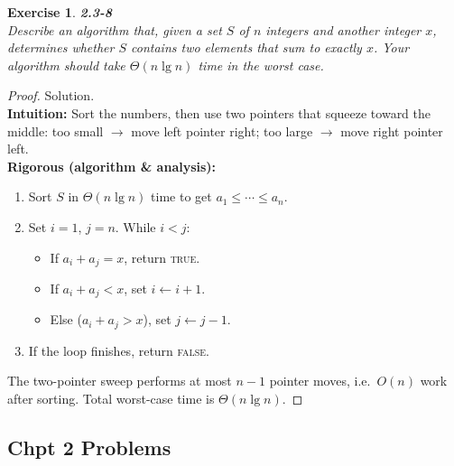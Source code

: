 \documentclass[12pt]{article}
\newtheorem{exercise}[theorem]{Exercise}
\theoremstyle{definition}
\begin{document}
\newpage

\begin{exercise}
\noindent
\textbf{2.3-8}\\
\noindent
Describe an algorithm that, given a set $S$ of $n$ integers and another integer $x$,
determines whether $S$ contains two elements that sum to exactly $x$. Your algorithm
should take $\Theta(n\lg n)$ time in the worst case.
\end{exercise}

\vspace{1pt}

\begin{proof}
Solution.\\

\noindent
\textbf{Intuition:} Sort the numbers, then use two pointers that squeeze
toward the middle: too small $\to$ move left pointer right; too large $\to$
move right pointer left.\\

\noindent
\textbf{Rigorous (algorithm \& analysis):}
\begin{enumerate}
\item Sort $S$ in $\Theta(n\lg n)$ time to get $a_1\le \cdots \le a_n$.
\item Set $i=1$, $j=n$. While $i<j$:
  \begin{itemize}
    \item If $a_i+a_j=x$, return \textsc{true}.
    \item If $a_i+a_j<x$, set $i\gets i+1$.
    \item Else ($a_i+a_j>x$), set $j\gets j-1$.
  \end{itemize}
\item If the loop finishes, return \textsc{false}.
\end{enumerate}
The two-pointer sweep performs at most $n-1$ pointer moves, i.e.\ $O(n)$
work after sorting. Total worst-case time is $\Theta(n\lg n)$.
\end{proof}

\dotfill
\newpage

\subsection*{Chpt 2 Problems}

\end{document}
